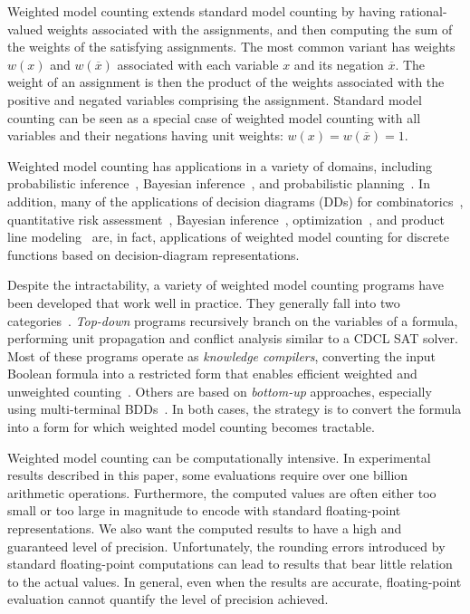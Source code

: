 \documentclass[letterpaper,USenglish,cleveref, autoref, thm-restate]{lipics-v2021}
\newcommand{\obar}[1]{\overline{#1}}
\begin{document}
Weighted model counting extends standard model counting by having
rational-valued weights associated with the assignments, and then
computing the sum of the weights of the satisfying assignments.  The
most common variant has weights $w(x)$ and $w(\obar{x})$
associated with each variable $x$ and its negation $\obar{x}$.  The
weight of an assignment is then the product of the weights associated
with the positive and negated variables comprising the assignment.
Standard model counting can be seen as a special case of weighted model
counting with all variables and their negations having unit weights: $w(x) = w(\obar{x}) = 1$.

Weighted model counting has applications in a variety of domains,
including probabilistic inference~\cite{chavira:ai:2008}, Bayesian
inference~\cite{sang:aaai:2005}, and probabilistic
planning~\cite{domshlak:jair:2007}.  In addition, many of the
applications of decision diagrams (DDs) for
combinatorics~\cite{knuth:bdd:2011}, quantitative risk
assessment~\cite{andrews:ieeetr:2000,groen:ress:2006,xing:wiley:2015,xing:amm:2025},
Bayesian inference~\cite{minato:ijcai:2007},
optimization~\cite{bergman:book:2016}, and
product line modeling~\cite{andersen:jair:2010} are, in fact, applications of
weighted model counting for discrete functions based on decision-diagram representations.

Despite the intractability, a variety of weighted model counting
programs have been developed that work well in practice.  They
generally fall into two categories~\cite{shaw:kr:2024}. \emph{Top-down} programs
recursively branch on the variables of a formula, performing unit
propagation and conflict analysis similar to a CDCL SAT solver.  Most
of these programs operate as \emph{knowledge compilers}, converting
the input Boolean formula into a restricted form that enables efficient
weighted and unweighted counting~\cite{darwiche:aaai:2002,darwiche:ecai:2004,lagniez:ijcai:2017,muise:cai:2012,oztok:cp:2014,sharma:ijcai:2019}.
Others are based on \emph{bottom-up} approaches, especially using
multi-terminal BDDs~\cite{dudek:aaai:2020,dudek:sat:2021}.  In both
cases, the strategy is to convert the formula into a form for which
weighted model counting becomes tractable.

Weighted model counting can be computationally intensive.  In
experimental results described in this paper, some evaluations 
require over one billion arithmetic operations.
Furthermore, the computed values are often either too small or too
large in magnitude to encode with standard floating-point
representations.  We also want the computed results to have a
high and guaranteed level of precision.  Unfortunately, the rounding errors
introduced by standard floating-point computations can lead to results
that bear little relation to the actual values.  In general, even when the results are accurate,
floating-point evaluation cannot quantify the level of precision achieved.
\end{document}
